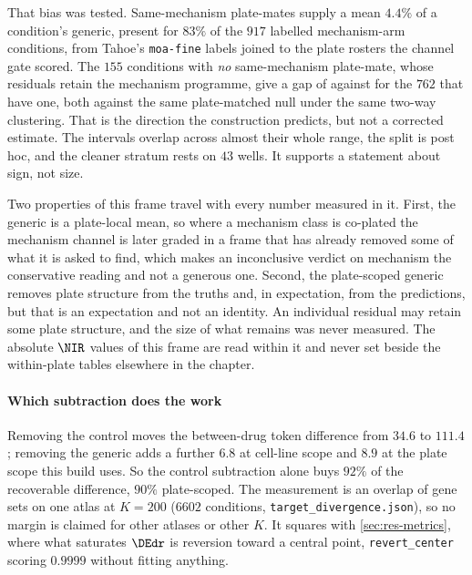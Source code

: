 That bias was tested. Same-mechanism plate-mates supply a mean $4.4\%$ of a
condition's generic, present for $83\%$ of the $\num{917}$ labelled
mechanism-arm conditions, from Tahoe's \texttt{moa-fine} labels joined to the
plate rosters the channel gate scored. The $\num{155}$ conditions with \emph{no}
same-mechanism plate-mate, whose residuals retain the mechanism programme, give a
gap of  against  for
the $\num{762}$ that have one, both against the same plate-matched null under the
same two-way clustering. That is the direction the construction predicts, but not
a corrected estimate. The intervals overlap across almost their whole range, the
split is post hoc, and the cleaner stratum rests on $\num{43}$ wells. It supports
a statement about sign, not size.

\begin{scopelimit}
Two properties of this frame travel with every number measured in it. First, the
generic is a plate-local mean, so where a mechanism class is co-plated the
mechanism channel is later graded in a frame that has already removed some of
what it is asked to find, which makes an inconclusive verdict on mechanism the
conservative reading and not a generous one. Second, the plate-scoped generic
removes plate structure from the truths and, in expectation, from the
predictions, but that is an expectation and not an identity. An individual
residual may retain some plate structure, and the size of what remains was never
measured. The absolute $\NIR$ values of this frame are read within it and never
set beside the within-plate tables elsewhere in the chapter.
\end{scopelimit}

\paragraph{Which subtraction does the work} Removing the control moves the
between-drug token difference from $34.6$ to $111.4$; removing the generic adds a
further $6.8$ at cell-line scope and $8.9$ at the plate scope this build uses. So
the control subtraction alone buys $92\%$ of the recoverable difference, $90\%$
plate-scoped. The measurement is an overlap of gene sets on one atlas at $K = 200$
($\num{6602}$ conditions, \texttt{target\_divergence.json}), so no margin is
claimed for other atlases or other $K$. It squares with \cref{sec:res-metrics},
where what saturates $\DEdr$ is reversion toward a central point,
\texttt{revert\_center} scoring $0.9999$ without fitting anything.

